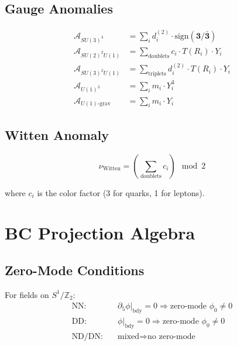 \documentclass[11pt,a4paper]{article}
\begin{document}
\subsection{Gauge Anomalies}
\label{app:gauge-anomalies}

\begin{align}
\label{eq:anom-su33}
\mathcal{A}_{SU(3)^3} &= \sum_i d_i^{(2)} \cdot \text{sign}(\mathbf{3}/\bar{\mathbf{3}}) \\
\label{eq:anom-su2u1}
\mathcal{A}_{SU(2)^2U(1)} &= \sum_{\text{doublets}} c_i \cdot T(R_i) \cdot Y_i \\
\label{eq:anom-su3u1}
\mathcal{A}_{SU(3)^2U(1)} &= \sum_{\text{triplets}} d_i^{(2)} \cdot T(R_i) \cdot Y_i \\
\label{eq:anom-u13}
\mathcal{A}_{U(1)^3} &= \sum_i m_i \cdot Y_i^3 \\
\label{eq:anom-grav}
\mathcal{A}_{U(1)\text{-grav}} &= \sum_i m_i \cdot Y_i
\end{align}

\subsection{Witten Anomaly}
\label{app:witten}

\begin{equation}
\label{eq:witten-formula}
\nu_{\text{Witten}} = \left(\sum_{\text{doublets}} c_i\right) \mod 2
\end{equation}

where $c_i$ is the color factor (3 for quarks, 1 for leptons).

\section{BC Projection Algebra}
\label{app:bc-algebra}

\subsection{Zero-Mode Conditions}
\label{app:zero-mode}

For fields on $S^1/\mathbb{Z}_2$:
\begin{align}
\label{eq:bc-nn}
\text{NN:} \quad &\partial_5 \phi |_{\text{bdy}} = 0 \Rightarrow \text{zero-mode } \phi_0 \neq 0 \\
\label{eq:bc-dd}
\text{DD:} \quad &\phi |_{\text{bdy}} = 0 \Rightarrow \text{zero-mode } \phi_0 \neq 0 \\
\label{eq:bc-nd}
\text{ND/DN:} \quad &\text{mixed} \Rightarrow \text{no zero-mode}
\end{align}
\end{document}
